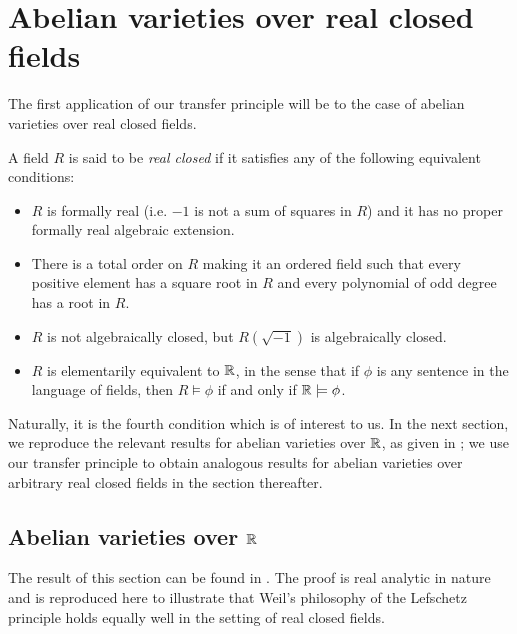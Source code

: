 

\chapter{Abelian varieties over real closed fields}
The first application of our transfer principle will be to the case of abelian varieties over real closed fields.

\begin{definition}
A field $R$ is said to be \emph{real closed} if it satisfies any of the following equivalent conditions:
	\begin{itemize}
		\item $R$ is formally real (i.e. $-1$ is not a sum of squares in $R$) and it has no proper formally real algebraic extension.
		\item There is a total order on $R$ making it an ordered field such that every positive element has a square root in $R$ and every polynomial of odd degree has a root in $R$.
		\item $R$ is not algebraically closed, but $R(\sqrt{-1})$ is algebraically closed.
		\item $R$ is elementarily equivalent to $\mathbb{R}$, in the sense that if $\phi$ is any sentence in the language of fields, then $R\models \phi$ if and only if $\mathbb{R}\models \phi$.
	\end{itemize}
\end{definition}

Naturally, it is the fourth condition which is of interest to us. In the next section, we reproduce the relevant results for abelian varieties over $\mathbb{R}$, as given in \cite{gross-harris}; we use our transfer principle to obtain analogous results for abelian varieties over arbitrary real closed fields in the section thereafter.

\section{Abelian varieties over $\mathbb{R}$}
The result of this section can be found in \cite{gross-harris}. The proof is real analytic in nature and is reproduced here to illustrate that Weil's philosophy of the Lefschetz principle holds equally well in the setting of real closed fields.

